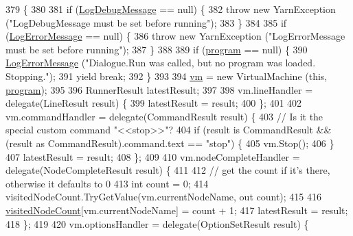 \begin{DoxyCode}
379                                                                                              \{
380 
381             \textcolor{keywordflow}{if} (\hyperlink{a00086_a381f48bb0fbb294f8cf44ca57f11be31}{LogDebugMessage} == null) \{
382                 \textcolor{keywordflow}{throw} \textcolor{keyword}{new} YarnException (\textcolor{stringliteral}{"LogDebugMessage must be set before running"});
383             \}
384 
385             \textcolor{keywordflow}{if} (\hyperlink{a00086_a9801e83dd044d6498fdf6ebcc6bec5ac}{LogErrorMessage} == null) \{
386                 \textcolor{keywordflow}{throw} \textcolor{keyword}{new} YarnException (\textcolor{stringliteral}{"LogErrorMessage must be set before running"});
387             \}
388 
389             \textcolor{keywordflow}{if} (\hyperlink{a00086_a0a1cca92325f430425d784d416cb5c2b}{program} == null) \{
390                 \hyperlink{a00086_a9801e83dd044d6498fdf6ebcc6bec5ac}{LogErrorMessage} (\textcolor{stringliteral}{"Dialogue.Run was called, but no program was loaded.
       Stopping."});
391                 yield \textcolor{keywordflow}{break};
392             \}
393 
394             \hyperlink{a00086_a8c1319357a9df6cff051328fb33224c7}{vm} = \textcolor{keyword}{new} VirtualMachine (\textcolor{keyword}{this}, \hyperlink{a00086_a0a1cca92325f430425d784d416cb5c2b}{program});
395 
396             RunnerResult latestResult;
397 
398             vm.lineHandler = delegate(LineResult result) \{
399                 latestResult = result;
400             \};
401 
402             vm.commandHandler = delegate(CommandResult result) \{
403                 \textcolor{comment}{// Is it the special custom command "<<stop>>"?}
404                 \textcolor{keywordflow}{if} (result is CommandResult && (result as CommandResult).command.text == \textcolor{stringliteral}{"stop"}) \{
405                     vm.Stop();
406                 \}
407                 latestResult = result;
408             \};
409 
410             vm.nodeCompleteHandler = delegate(NodeCompleteResult result) \{
411 
412                 \textcolor{comment}{// get the count if it's there, otherwise it defaults to 0}
413                 \textcolor{keywordtype}{int} count = 0;
414                 visitedNodeCount.TryGetValue(vm.currentNodeName, out count);
415 
416                 \hyperlink{a00086_aae9e64354066a1e2fa130629959d772b}{visitedNodeCount}[vm.currentNodeName] = count + 1;
417                 latestResult = result;
418             \};
419 
420             vm.optionsHandler = delegate(OptionSetResult result) \{

\end{DoxyCode}
